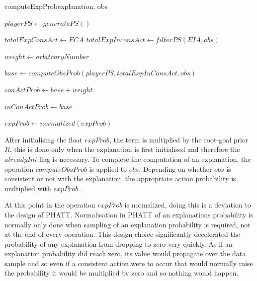 \documentclass[parskip]{cs4rep}
\begin{document}
\begin{pseudocode}[ruled]{computeExpProb}{explanation, obs}
\begin{algorithm}[H]


$playerPS \gets generatePS()$

$totalExpConsAct \gets ECA$
$totalExpInconsAct \gets filterPS(EIA, obs)$

$weight \gets arbitraryNumber$ \newline

$base \gets computeObsProb(playerPS, totalExpInConsAct, obs)$ 

$conActProb \gets base + weight$

$inConActProb \gets base$ \newline


$expProb \gets normalized(expProb)$

\end{algorithm}
\end{pseudocode}

After initialising the float $expProb$, the term is multiplied by the root-goal prior $R$, this is done only when the explanation is first initialised and therefore the $alreadyIni$ flag is necessary. To complete the computation of an explanation, the operation $computeObsProb$ is applied to $obs$. Depending on whether $obs$ is consistent or not with the explanation, the appropriate action probability is multiplied with $expProb$ .

At this point in the operation $expProb$ is normalized, doing this is a deviation to the design of PHATT. Normalisation in PHATT of an explanations probability is normally only done when sampling of an explanation probability is required, not at the end of every operation. This design choice significantly decelerated the probability of any explanation from dropping to zero very quickly. As if an explanation probability did reach zero, its value would propagate over the data sample and so even if a consistent action were to occur that would normally raise the probability it would be multiplied by zero and so nothing would happen. 
\end{document}
